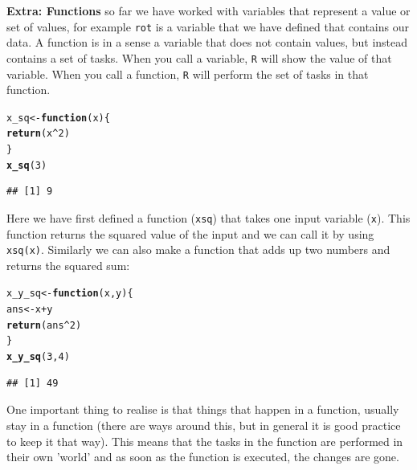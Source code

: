 \documentclass[12pt,a4paper]{article}\usepackage[]{graphicx}\usepackage[]{color}
\makeatletter
\newcommand{\hlnum}[1]{\textcolor[rgb]{0.686,0.059,0.569}{#1}}%
\newcommand{\hlopt}[1]{\textcolor[rgb]{0,0,0}{#1}}%
\newcommand{\hlstd}[1]{\textcolor[rgb]{0.345,0.345,0.345}{#1}}%
\newcommand{\hlkwa}[1]{\textcolor[rgb]{0.161,0.373,0.58}{\textbf{#1}}}%
\newcommand{\hlkwb}[1]{\textcolor[rgb]{0.69,0.353,0.396}{#1}}%
\newcommand{\hlkwc}[1]{\textcolor[rgb]{0.333,0.667,0.333}{#1}}%
\newcommand{\hlkwd}[1]{\textcolor[rgb]{0.737,0.353,0.396}{\textbf{#1}}}%
\newenvironment{kframe}{%
 \def\at@end@of@kframe{}%
 \ifinner\ifhmode%
  \def\at@end@of@kframe{\end{minipage}}%
  \begin{minipage}{\columnwidth}%
 \fi\fi%
 \def\FrameCommand##1{\hskip\@totalleftmargin \hskip-\fboxsep
 \colorbox{shadecolor}{##1}\hskip-\fboxsep
     \hskip-\linewidth \hskip-\@totalleftmargin \hskip\columnwidth}%
 \MakeFramed {\advance\hsize-\width
   \@totalleftmargin\z@ \linewidth\hsize
   \@setminipage}}%
 {\par\unskip\endMakeFramed%
 \at@end@of@kframe}
\newenvironment{knitrout}{}{} %
\makeatother
\begin{document}
\begin{mdframed}
\textbf{Extra: Functions} so far we have worked with variables that represent a value or set of values, for example \texttt{rot} is a variable that we have defined that contains our data. A function is in a sense a variable that does not contain values, but instead contains a set of tasks. When you call a variable, \texttt{R} will show the value of that variable. When you call a function, \texttt{R} will perform the set of tasks in that function.
\begin{knitrout}
\color{fgcolor}\begin{kframe}
\begin{alltt}
\hlstd{x_sq} \hlkwb{<-} \hlkwa{function}\hlstd{(}\hlkwc{x}\hlstd{)\{}
  \hlkwd{return}\hlstd{(x}\hlopt{^}\hlnum{2}\hlstd{)}
\hlstd{\}}
\hlkwd{x_sq}\hlstd{(}\hlnum{3}\hlstd{)}
\end{alltt}
\begin{verbatim}
## [1] 9
\end{verbatim}
\end{kframe}
\end{knitrout}
Here we have first defined a function (\texttt{x\textunderscore sq}) that takes one input variable (\texttt{x}). This function returns the squared value of the input and we can call it by using \texttt{x\textunderscore sq(x)}. Similarly we can also make a function that adds up two numbers and returns the squared sum:
\begin{knitrout}
\color{fgcolor}\begin{kframe}
\begin{alltt}
\hlstd{x_y_sq} \hlkwb{<-} \hlkwa{function}\hlstd{(}\hlkwc{x}\hlstd{,}\hlkwc{y}\hlstd{)\{}
  \hlstd{ans} \hlkwb{<-} \hlstd{x} \hlopt{+} \hlstd{y}
  \hlkwd{return}\hlstd{(ans}\hlopt{^}\hlnum{2}\hlstd{)}
\hlstd{\}}
\hlkwd{x_y_sq}\hlstd{(}\hlnum{3}\hlstd{,} \hlnum{4}\hlstd{)}
\end{alltt}
\begin{verbatim}
## [1] 49
\end{verbatim}
\end{kframe}
\end{knitrout}
One important thing to realise is that things that happen in a function, usually stay in a function (there are ways around this, but in general it is good practice to keep it that way). This means that the tasks in the function are performed in their own 'world' and as soon as the function is executed, the changes are gone.

\end{mdframed}
\end{document}
